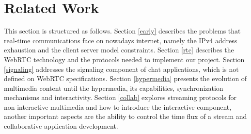 \section{Related Work}\label{related}
 This section is structured as follows.
 Section \ref{early} describes the problems that real-time communications face on nowadays internet, namely the \ac{IPv4} address exhaustion and the client server model constraints. 
 Section \ref{rtc} describes the \ac{WebRTC} technology and the protocols needed to implement our project. 
 Section \ref{signaling} addresses the signaling component of chat applications, which is not defined on \ac{WebRTC} specifications. 
 Section \ref{hypermedia} presents the evolution of multimedia content until the hypermedia, its capabilities, synchronization mechanisms and interactivity. 
 Section \ref{collab} explores streaming protocols for non-interactive multimedia and how to introduce the interactive component, another important aspects are the ability to control the time flux of a stream and collaborative application development.
        
